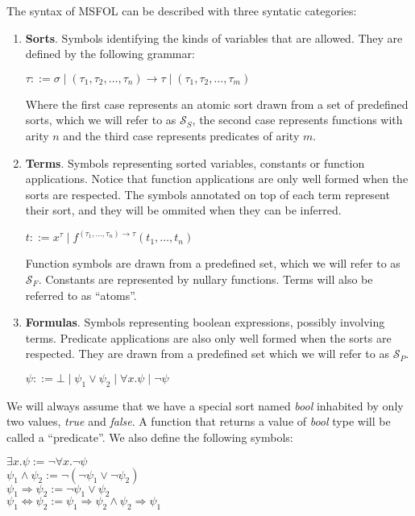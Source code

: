 The syntax of MSFOL can be described with three syntatic categories:

\begin{enumerate}
  \item \textbf{Sorts}. Symbols identifying the kinds of variables that are allowed. They are defined by the following grammar:
        \begin{center}
          $ \tau ::= \sigma \mid (\tau_{1}, \tau_{2}, \ldots, \tau_{n}) \rightarrow \tau \mid (\tau_{1}, \tau_{2}, \ldots, \tau_{m})$
        \end{center}
        Where the first case represents an atomic sort drawn from a set of predefined sorts, which we will refer to as $\mathcal{S}_{S}$, the second case represents functions with arity $n$ and the third case represents predicates of arity $m$.
  \item \textbf{Terms}. Symbols representing sorted variables, constants or function applications. Notice that function applications are only well formed when the sorts are respected. The symbols annotated on top of each term represent their sort, and they will be ommited when they can be inferred.
        \begin{center}
          $ t ::= x^{\tau} \mid f^{(\tau_{1}, \ldots, \tau_{n}) \rightarrow \tau}(t_{1}, \dots, t_{n}) $
        \end{center}
        Function symbols are drawn from a predefined set, which we will refer to as $\mathcal{S}_{F}$. Constants are represented by nullary functions. Terms will also be referred to as ``atoms''.
  \item \textbf{Formulas}. Symbols representing boolean expressions, possibly involving terms. Predicate applications are also only well formed when the sorts are respected. They are drawn from a predefined set which we will refer to as $\mathcal{S}_{P}$.
        \begin{center}
          $ \psi ::= \bot \mid \psi_{1} \vee \psi_{2} \mid \forall x.\psi \mid \neg \psi $ %
        \end{center}
\end{enumerate}

We will always assume that we have a special sort named \textit{bool} inhabited by only two values, \textit{true} and \textit{false}. A function that returns a value of \textit{bool} type will be called a ``predicate''.
We also define the following symbols:

\begin{center}
  $\exists x. \psi := \neg \forall x. \neg \psi$\\
  $\psi_{1} \wedge \psi_{2} := \neg (\neg \psi_{1} \vee \neg \psi_{2})$\\
  $\psi_{1} \Rightarrow \psi_{2} := \neg \psi_{1} \vee \psi_{2}$\\
  $\psi_{1} \Leftrightarrow \psi_{2} := \psi_{1} \Rightarrow \psi_{2} \wedge \psi_{2} \Rightarrow \psi_{1}$
\end{center}


